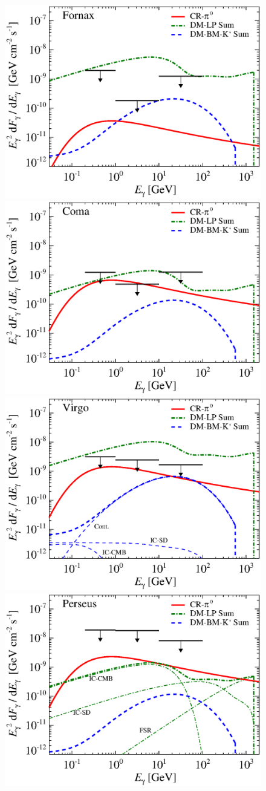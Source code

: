 \documentclass[10pt,aps,pra,reprint,amsmath,amsfonts,amssymb,showpacs]{revtex4-1}
\begin{document}
\begin{figure}
\begin{minipage}{2.0\columnwidth}
 \includegraphics[width=0.49\columnwidth]{figures/flux.cluster.Fornax.v9.0.1deg.1.6T.SubMass.SF300.IR2.noMW.woGal.eps}
\includegraphics[width=0.49\columnwidth]{figures/flux.cluster.Coma.v9.0.1deg.1.6T.SubMass.SF300.IR2.noMW.woGal.eps}
\includegraphics[width=0.49\columnwidth]{figures/flux.cluster.Virgo.v9.0.1deg.1.6T.SubMass.SF300.IR2.noMW.woGal.eps}
\includegraphics[width=0.49\columnwidth]{figures/flux.cluster.Perseus.v9.0.1deg.1.6T.SubMass.SF300.IR2.noMW.woGal.eps}

\end{minipage}
\end{figure}
\end{document}
